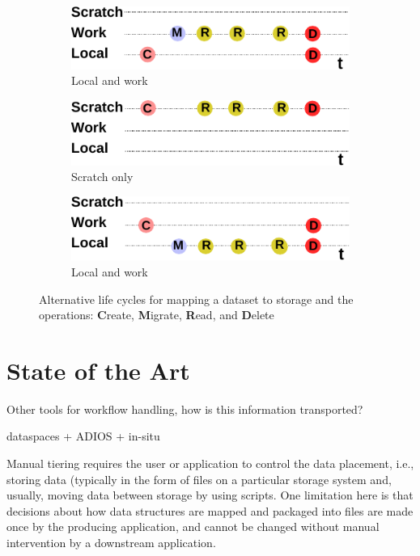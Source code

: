 \documentclass[a4paper]{article}
\begin{document}
\begin{figure}[tb]
  \centering
  \begin{subfigure}{.45\textwidth}
  \includegraphics[width=0.9\columnwidth]{lifecycle-1}
  \caption{Local and work}
  \end{subfigure}
  \begin{subfigure}{.45\textwidth}
  \includegraphics[width=0.9\columnwidth]{lifecycle-2}
  \caption{Scratch only}
  \end{subfigure}

  \begin{subfigure}{.45\textwidth}
  \includegraphics[width=0.9\columnwidth]{lifecycle-3}
  \caption{Local and work}
  \end{subfigure}

  \caption{Alternative life cycles for mapping a dataset to storage and the operations: \textbf{C}reate, \textbf{M}igrate, \textbf{R}ead, and \textbf{D}elete}
  \label{fig:lifecycle}
\end{figure}


\section{State of the Art}

Other tools for workflow handling, how is this information transported?

dataspaces + ADIOS + in-situ

Manual tiering requires the user or application to control the data placement, i.e., storing data (typically in the form of files on a particular storage system and, usually, moving data between storage by using scripts.
One limitation here is that decisions about how data structures are mapped and packaged into files are made once by the producing application, and cannot be changed without manual intervention by a downstream application.
\end{document}
